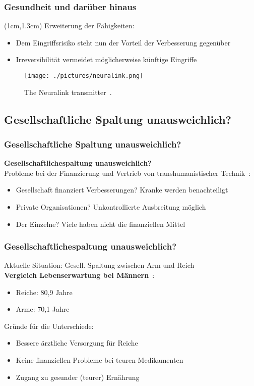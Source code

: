 \documentclass[aspectratio=169,16pt,xcolor=table]{beamer}
\begin{document}
\begin{frame}
  \frametitle{Gesundheit und darüber hinaus}
  \begin{textblock*}{15cm}(1cm,1.3cm)
    Erweiterung der Fähigkeiten:
    \begin{itemize}
        \item Dem Eingriffsrisiko steht nun der Vorteil der Verbesserung gegenüber
        \item Irreversibilität vermeidet möglicherweise künftige Eingriffe
    \end{itemize}
  \end{textblock*}
  \begin{figure}[h]
    \centering   
	\texttt{[image: ./pictures/neuralink.png]}
    \caption{
      The Neuralink transmitter~\cite{Strickland:2021aa}.
    }
  \end{figure}
  \vspace{-4.2cm}
\end{frame}

\subsection{Gesellschaftliche Spaltung unausweichlich?}
\begin{frame}
  \frametitle{Gesellschaftliche Spaltung unausweichlich?}
  \small \textbf{Gesellschaftlichespaltung unausweichlich?}\\
  \small Probleme bei der Finanzierung und Vertrieb von transhumanistischer Technik~\cite{khan_aziz_2019}:
  \begin{itemize}
    \item Gesellschaft finanziert Verbesserungen? Kranke werden benachteiligt
    \item Private Organisationen? Unkontrollierte Ausbreitung möglich
    \item Der Einzelne? Viele haben nicht die finanziellen Mittel
  \end{itemize}
 \end{frame}

\begin{frame}
  \frametitle{Gesellschaftlichespaltung unausweichlich?}
  \small Aktuelle Situation: Gesell. Spaltung zwischen Arm und Reich\\
  \small \textbf{Vergleich Lebenserwartung bei Männern}~\cite{lampert2014}:
  \begin{itemize}
    \item Reiche: 80,9 Jahre
    \item Arme: 70,1 Jahre
  \end{itemize}
  \small Gründe für die Unterschiede:
  \begin{itemize}
    \item Bessere ärztliche Versorgung für Reiche
    \item Keine finanziellen Probleme bei teuren Medikamenten
    \item Zugang zu gesunder (teurer) Ernährung
  \end{itemize}
\end{frame}
\end{document}
